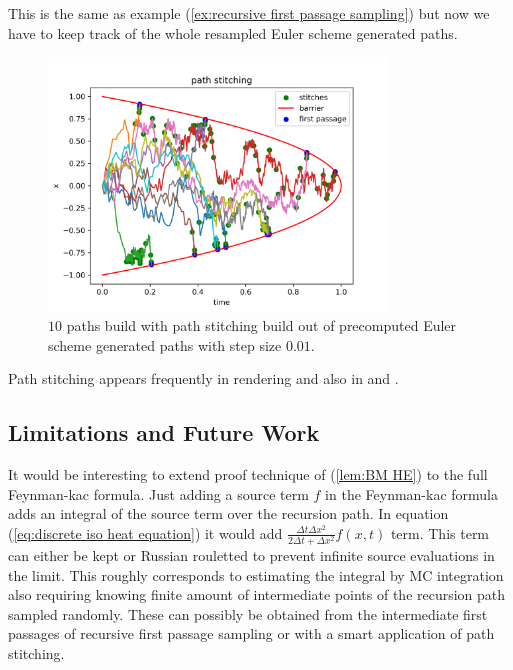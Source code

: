 \documentclass[a4paper,12pt]{article}
\begin{document}
\begin{example}
    This is the same as example (\ref{ex:recursive first passage sampling}) but now we have
    to keep track of the whole resampled Euler scheme generated paths.

    \begin{figure}[ht!]
        \centering
        \includegraphics[width=0.8\textwidth]{plots/path stitching para.png}
        \caption{ $10$ paths build with path stitching build out of
            precomputed Euler scheme generated paths with step size $0.01$.}
        \label{fig:path stitching para}
    \end{figure}
\end{example}




\begin{related}
    Path stitching appears frequently in rendering and also in \cite{das_sarma_fast_2015}
    and \cite{ji_reusing_2012}.
\end{related}

\subsection{Limitations and Future Work}

It would be interesting to extend proof technique of (\ref{lem:BM HE}) to the full
Feynman-kac formula. Just adding a source term $f$ in the Feynman-kac formula adds
an integral of the source term over the recursion path.
In equation (\ref{eq:discrete iso heat equation})
it would add $\frac{\Delta t \Delta x^{2}}{2 \Delta t + \Delta x ^{2}} f(x,t)$
term. This term can either be kept or Russian rouletted
to prevent infinite source evaluations in the limit.
This roughly corresponds to estimating the integral by
MC integration also requiring knowing finite amount of
intermediate points of the recursion path
sampled randomly. These can possibly be obtained from
the intermediate first passages of recursive first passage sampling or with a smart
application of path stitching. \\
\end{document}

